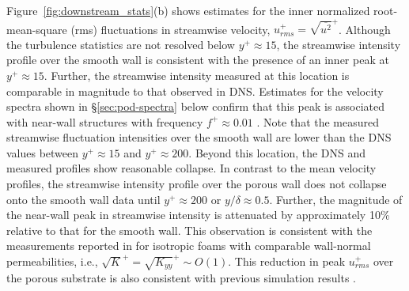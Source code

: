 \documentclass[letterpaper,11pt]{article}
\newcommand{\kpyy}{\sqrt{K_{yy}}^+}
\begin{document}
Figure~\ref{fig:downstream_stats}(b) shows estimates for the inner normalized root-mean-square (rms) fluctuations in streamwise velocity, $u_{rms}^+ = \sqrt{\overline{u^2}}^+$.  Although the turbulence statistics are not resolved below $y^+ \approx 15$, the streamwise intensity profile over the smooth wall is consistent with the presence of an inner peak at $y^+ \approx 15$.  Further, the streamwise intensity measured at this location is comparable in magnitude to that observed in DNS.  Estimates for the velocity spectra shown in \S\ref{sec:pod-spectra} below confirm that this peak is associated with near-wall structures with frequency $f^+ \approx 0.01$ \citep{robinson1991coherent,jimenez1999autonomous}. Note that the measured streamwise fluctuation intensities over the smooth wall are lower than the DNS values between $y^+ \approx 15$ and $y^+ \approx 200$.  Beyond this location, the DNS and measured profiles show reasonable collapse. In contrast to the mean velocity profiles, the streamwise intensity profile over the porous wall does not collapse onto the smooth wall data until $y^+\approx 200$ or $y/\delta \approx 0.5$. Further, the magnitude of the near-wall peak in streamwise intensity is attenuated by approximately 10\% relative to that for the smooth wall. This observation is consistent with the measurements reported in \citet{efstathiou2018mean} for isotropic foams with comparable wall-normal permeabilities, i.e., $\sqrt{K}^+ = \kpyy \sim O(1)$.  This reduction in peak $u_{rms}^+$ over the porous substrate is also consistent with previous simulation results \citep{breugem2006influence,chandesris2013direct,gomez2019turbulent}.
\end{document}

